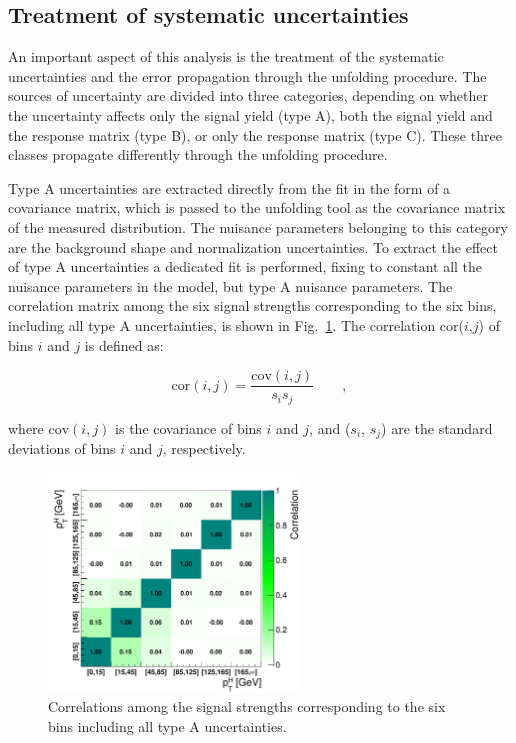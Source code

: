 \subsection{Treatment of systematic uncertainties}\label{sec:uncunf}

An important aspect of this analysis is the treatment of the systematic
uncertainties and the error propagation through the unfolding procedure.
The sources of uncertainty are divided into three categories, depending
on whether the uncertainty affects only the signal yield (type A), both the signal
yield and the response matrix (type B), or only the response matrix (type C).
These three classes propagate differently through the unfolding procedure.

Type A uncertainties are extracted directly from the fit in the form of a covariance
matrix, which is passed to the unfolding tool as the covariance
matrix of the measured distribution. The nuisance parameters belonging to this category
are the background shape and normalization uncertainties.
To extract the effect of type A uncertainties a dedicated fit is performed,
fixing to constant all the nuisance parameters in the model, but type A nuisance parameters.
The correlation matrix among the six signal strengths corresponding to the six \pth bins, including all type A uncertainties, is shown in Fig.~\ref{fig:typeA_corr}.
The correlation cor($i$,$j$) of bins $i$ and $j$ is defined as:	

\begin{equation}\label{eq:correlation}
\mathrm{cor}(i,j) = \frac{ \mathrm{cov}(i,j) }{  s_{i}s_{j} } \qquad ,
\end{equation} 

where $\mathrm{cov}(i,j)$ is the covariance of bins $i$ and $j$, and ($s_{i}$,
$s_{j}$) are the standard deviations of bins $i$ and $j$,  respectively.

\begin{figure}[htb]
\centering
\includegraphics[width=0.6\textwidth]{images/typeACovMatrix.pdf}
\caption{Correlations among the signal strengths corresponding to the six \pth bins including all type A uncertainties.}\label{fig:typeA_corr}
\end{figure}

